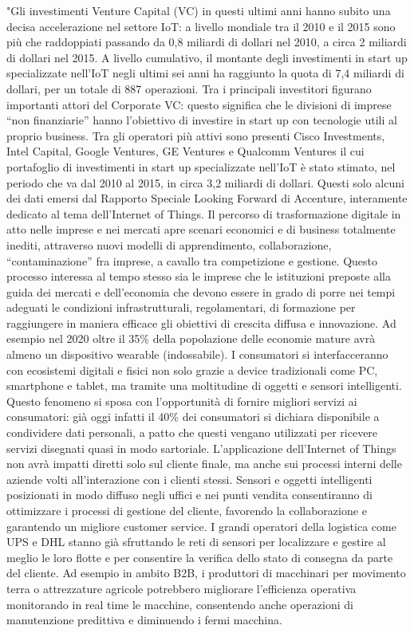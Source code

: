\documentclass[a4paper]{report} %
\begin{document}
"Gli investimenti Venture Capital (VC) in questi ultimi anni hanno subito una decisa accelerazione nel settore IoT: a livello mondiale tra il 2010 e il 2015 sono più che raddoppiati passando da 0,8 miliardi di dollari nel 2010, a circa 2 miliardi di dollari nel 2015. A livello cumulativo, il montante degli investimenti in start up specializzate nell’IoT negli ultimi sei anni ha raggiunto la quota di 7,4 miliardi di dollari, per un totale di 887 operazioni. Tra i principali investitori figurano importanti attori del Corporate VC: questo significa che le divisioni di imprese “non finanziarie” hanno l’obiettivo di investire in start up con tecnologie utili al proprio business. Tra gli operatori più attivi sono presenti Cisco Investments, Intel Capital, Google Ventures, GE Ventures e Qualcomm Ventures il cui portafoglio di investimenti in start up specializzate nell’IoT è stato stimato, nel periodo che va dal 2010 al 2015, in circa 3,2 miliardi di dollari. Questi solo alcuni dei dati emersi dal Rapporto Speciale Looking Forward di Accenture, interamente dedicato al tema dell’Internet of Things.
Il percorso di trasformazione digitale in atto nelle imprese e nei mercati apre scenari economici e di business totalmente inediti, attraverso nuovi modelli di apprendimento, collaborazione, “contaminazione” fra imprese, a cavallo tra competizione e gestione. Questo processo interessa al tempo stesso sia le imprese che le istituzioni preposte alla guida dei mercati e dell’economia che devono essere in grado di porre nei tempi adeguati le condizioni infrastrutturali, regolamentari, di formazione per raggiungere in maniera efficace gli obiettivi di crescita diffusa e innovazione. Ad esempio nel 2020 oltre il 35\% della popolazione delle economie mature avrà almeno un dispositivo wearable (indossabile). I consumatori si interfacceranno con ecosistemi digitali e fisici non solo grazie a device tradizionali come PC, smartphone e tablet, ma tramite una moltitudine di oggetti e sensori intelligenti. Questo fenomeno si sposa con l’opportunità di fornire migliori servizi ai consumatori: già oggi infatti il 40\% dei consumatori si dichiara disponibile a condividere dati personali, a patto che questi vengano utilizzati per ricevere servizi disegnati quasi in modo sartoriale. L’applicazione dell’Internet of Things non avrà impatti diretti solo sul cliente finale, ma anche sui processi interni delle aziende volti all’interazione con i clienti stessi. Sensori e oggetti intelligenti posizionati in modo diffuso negli uffici e nei punti vendita consentiranno di ottimizzare i processi di gestione del cliente, favorendo la collaborazione e garantendo un migliore customer service. I grandi operatori della logistica come UPS e DHL stanno già sfruttando le reti di sensori per localizzare e gestire al meglio le loro flotte e per consentire la verifica dello stato di consegna da parte del cliente. Ad esempio in ambito B2B, i produttori di macchinari per movimento terra o attrezzature agricole potrebbero migliorare l’efficienza operativa monitorando in real time le macchine, consentendo anche operazioni di manutenzione predittiva e diminuendo i fermi macchina. 
\end{document}
